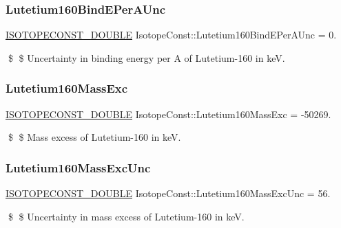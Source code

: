 \subsubsection{\texorpdfstring{Lutetium160\+Bind\+E\+Per\+A\+Unc}{Lutetium160BindEPerAUnc}}
{\footnotesize\ttfamily \mbox{\hyperlink{group___isotope_const-_macros_ga8f45a7272ce02c0b4c65c44636ed719a}{I\+S\+O\+T\+O\+P\+E\+C\+O\+N\+S\+T\+\_\+\+D\+O\+U\+B\+LE}} Isotope\+Const\+::\+Lutetium160\+Bind\+E\+Per\+A\+Unc = 0.}

\$ \$ Uncertainty in binding energy per A of Lutetium-\/160 in keV. \mbox{\label{group___isotope_const-_lutetium-_lu160_ga8deec663428a192e2063a75ce62fd606}} 
\subsubsection{\texorpdfstring{Lutetium160\+Mass\+Exc}{Lutetium160MassExc}}
{\footnotesize\ttfamily \mbox{\hyperlink{group___isotope_const-_macros_ga8f45a7272ce02c0b4c65c44636ed719a}{I\+S\+O\+T\+O\+P\+E\+C\+O\+N\+S\+T\+\_\+\+D\+O\+U\+B\+LE}} Isotope\+Const\+::\+Lutetium160\+Mass\+Exc = -\/50269.}

\$ \$ Mass excess of Lutetium-\/160 in keV. \mbox{\label{group___isotope_const-_lutetium-_lu160_ga45547fe3ad0a6d192443265dcf6fecff}} 
\subsubsection{\texorpdfstring{Lutetium160\+Mass\+Exc\+Unc}{Lutetium160MassExcUnc}}
{\footnotesize\ttfamily \mbox{\hyperlink{group___isotope_const-_macros_ga8f45a7272ce02c0b4c65c44636ed719a}{I\+S\+O\+T\+O\+P\+E\+C\+O\+N\+S\+T\+\_\+\+D\+O\+U\+B\+LE}} Isotope\+Const\+::\+Lutetium160\+Mass\+Exc\+Unc = 56.}

\$ \$ Uncertainty in mass excess of Lutetium-\/160 in keV. \mbox{\label{group___isotope_const-_lutetium-_lu160_ga11c4e8482b3df0c848d8d344461130d1}} 
